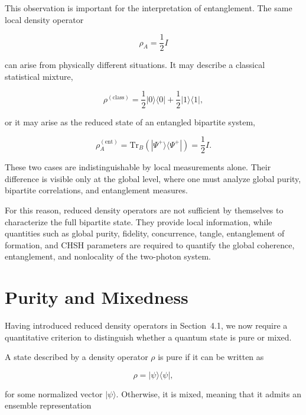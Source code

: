 \medskip

This observation is important for the interpretation of entanglement. The same local density operator

\[
\rho_A
=
\frac{1}{2}I
\]

can arise from physically different situations. It may describe a classical statistical mixture,

\[
\rho^{(\mathrm{class})}
=
\frac{1}{2}
|0\rangle\langle 0|
+
\frac{1}{2}
|1\rangle\langle 1|,
\]

or it may arise as the reduced state of an entangled bipartite system,

\[
\rho_A^{(\mathrm{ent})}
=
\mathrm{Tr}_B
\left(
|\Psi^+\rangle\langle\Psi^+|
\right)
=
\frac{1}{2}I.
\]

These two cases are indistinguishable by local measurements alone. Their difference is visible only at the global level, where one must analyze global purity, bipartite correlations, and entanglement measures.

\medskip

For this reason, reduced density operators are not sufficient by themselves to characterize the full bipartite state. They provide local information, while quantities such as global purity, fidelity, concurrence, tangle, entanglement of formation, and CHSH parameters are required to quantify the global coherence, entanglement, and nonlocality of the two-photon system.


\section{Purity and Mixedness}

Having introduced reduced density operators in Section~4.1, we now require a quantitative criterion to distinguish whether a quantum state is pure or mixed.

\medskip

A state described by a density operator \( \rho \) is pure if it can be written as

\begin{equation}
\rho
=
|\psi\rangle\langle\psi|,
\label{eq:pure_density_operator}
\end{equation}

for some normalized vector \( |\psi\rangle \). Otherwise, it is mixed, meaning that it admits an ensemble representation

